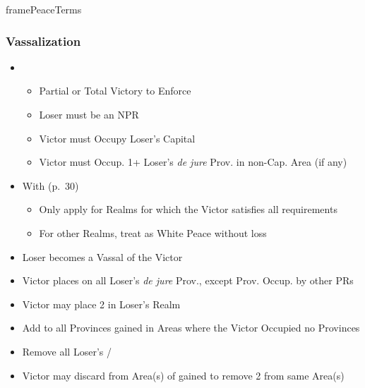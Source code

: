 \documentclass[10pt]{article}
\begin{document}
\begin{dynamiccontents*}{framePeaceTerms}
\begin{multicols}{3}
		\subsubsection*{Vassalization}
		\begin{itemize}
			\item {}
			\begin{itemize}
				\item Partial or Total Victory to Enforce
				\item Loser must be an NPR
				\item Victor must Occupy Loser's Capital
				\item Victor must Occup. 1+ Loser's \emph{de jure} Prov. in non-Cap. Area (if any)
			\end{itemize}
			\item With  (p.~30)
			\begin{itemize}
				\item Only apply for Realms for which the Victor satisfies all requirements
				\item For other Realms, treat as White Peace without \prestige loss
			\end{itemize}
			\item Loser becomes a Vassal of the Victor
			\item Victor places \vassalprovinces on all Loser's \emph{de jure} Prov., except Prov. Occup. by other PRs
			\item Victor may place 2 \influence in Loser's Realm
			\item Add \unrest to all Provinces gained in Areas where the Victor Occupied no Provinces
			\item Remove all Loser's \alliances/\marriages
			\item Victor may discard \claim from Area(s) of gained \vassalprovinces to remove 2 \unrest from same Area(s)
		\end{itemize}


\end{multicols}
\end{dynamiccontents*}
\end{document}

